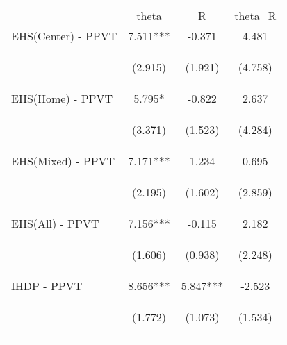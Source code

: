 \begin{tabular}{lccc}
\hline \noalign{\smallskip} & theta & R & theta\_R\\
\noalign{\smallskip}\hline \noalign{\smallskip}EHS(Center) - PPVT & 7.511*** & -0.371 & 4.481\\
 & \begin{footnotesize}(2.915)\end{footnotesize} & \begin{footnotesize}(1.921)\end{footnotesize} & \begin{footnotesize}(4.758)\end{footnotesize}\\
\noalign{\smallskip}EHS(Home) - PPVT & 5.795* & -0.822 & 2.637\\
 & \begin{footnotesize}(3.371)\end{footnotesize} & \begin{footnotesize}(1.523)\end{footnotesize} & \begin{footnotesize}(4.284)\end{footnotesize}\\
\noalign{\smallskip}EHS(Mixed) - PPVT & 7.171*** & 1.234 & 0.695\\
 & \begin{footnotesize}(2.195)\end{footnotesize} & \begin{footnotesize}(1.602)\end{footnotesize} & \begin{footnotesize}(2.859)\end{footnotesize}\\
\noalign{\smallskip}EHS(All) - PPVT & 7.156*** & -0.115 & 2.182\\
 & \begin{footnotesize}(1.606)\end{footnotesize} & \begin{footnotesize}(0.938)\end{footnotesize} & \begin{footnotesize}(2.248)\end{footnotesize}\\
\noalign{\smallskip}IHDP - PPVT & 8.656*** & 5.847*** & -2.523\\
 & \begin{footnotesize}(1.772)\end{footnotesize} & \begin{footnotesize}(1.073)\end{footnotesize} & \begin{footnotesize}(1.534)\end{footnotesize}\\

\end{tabular}
